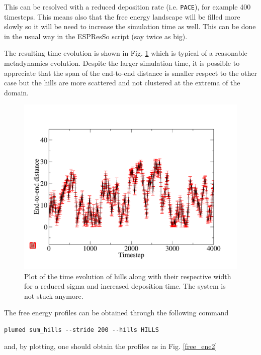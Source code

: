 \documentclass[10pt,fleqn,a4paper]{report}
\begin{document}
This can be resolved with a reduced deposition rate (i.e. \texttt{PACE}), for example 400 timesteps. This means also that the free energy landscape will be filled more slowly so it will be need to increase the simulation time as well. This can be done in the usual way in the ESPResSo script (say twice as big). 

The resulting time evolution is shown in Fig. \ref{timeline2} which is typical of a reasonable metadynamics evolution. Despite the larger simulation time, it is possible to appreciate that the span of the end-to-end distance is smaller respect to the other case but the hills are more scattered and not clustered at the extrema of the domain.

\begin{figure}[h!]
\begin{center}
\includegraphics[width=15cm,angle=0]{./figures/timeline2}
\caption{Plot of the time evolution of hills along with their respective width for a reduced sigma and increased deposition time. The system is not stuck anymore.}
\label{timeline2}
\end{center}
\end{figure} 

The free energy profiles can be obtained through the following command

\begin{verbatim}
plumed sum_hills --stride 200 --hills HILLS
\end{verbatim}

and, by plotting, one should obtain the profiles as in Fig. \ref{free_ene2}
\end{document}
